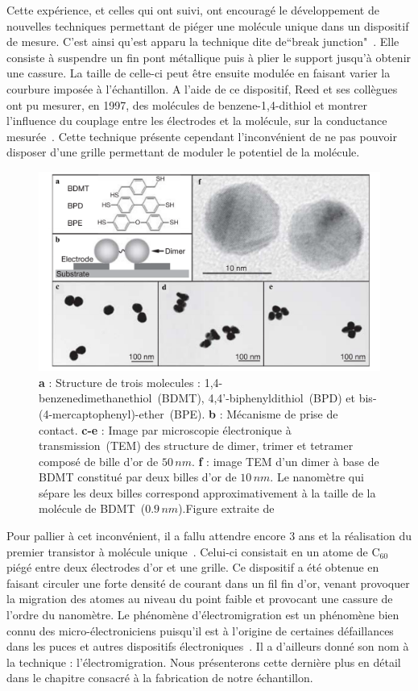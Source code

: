 Cette expérience, et celles qui ont suivi, ont encouragé le développement de nouvelles techniques permettant de piéger une molécule unique dans un dispositif de mesure. C'est ainsi qu'est apparu la technique dite de``break junction"~\cite{Zhou1995}. Elle consiste à suspendre un fin pont métallique puis à plier le support jusqu'à obtenir une cassure. La taille de celle-ci peut être ensuite modulée en faisant varier la courbure imposée à l'échantillon. A l'aide de ce dispositif, Reed et ses collègues ont pu mesurer, en 1997, des molécules de benzene-1,4-dithiol et montrer l'influence du couplage entre les électrodes et la molécule, sur la conductance mesurée~\cite{Reed1997}. Cette technique présente cependant l'inconvénient de ne pas pouvoir disposer d'une grille permettant de moduler le potentiel de la molécule.

\begin{figure}
\centering \includegraphics[scale=0.45]{Spintronique/MolSpintro2/MolSpintro2.pdf}
\caption{\textbf{a} : Structure de trois molecules : 1,4-benzenedimethanethiol~(BDMT), 4,4'-biphenyldithiol~(BPD) et bis-(4-mercaptophenyl)-ether~(BPE). \textbf{b} : Mécanisme de prise de contact. \textbf{c-e} : Image par microscopie électronique à transmission~(TEM) des structure de dimer, trimer et tetramer composé de bille d'or de $50\,nm$. \textbf{f} : image TEM d'un dimer à base de BDMT constitué par deux billes d'or de $10\,nm$. Le nanomètre qui sépare les deux billes correspond approximativement à la taille de la molécule de BDMT~($0.9\,nm$).Figure extraite de~\cite{Dadosh2005}}
\label{MolSpintro2}
\end{figure}


Pour pallier à cet inconvénient, il a fallu attendre encore 3 ans et la réalisation du premier transistor à molécule unique~\cite{Park2000}. Celui-ci consistait en un atome de C$_{60}$ piégé entre deux électrodes d'or et une grille. Ce dispositif a été obtenue en faisant circuler une forte densité de courant dans un fil fin d'or, venant provoquer la migration des atomes au niveau du point faible et provocant une cassure de l'ordre du nanomètre. Le phénomène d'électromigration est un phénomène bien connu des micro-électroniciens puisqu'il est à l'origine de certaines défaillances dans les puces et autres dispositifs électroniques~\cite{Ho1989,Tu1992}. Il a d'ailleurs donné son nom à la technique : l'électromigration. Nous présenterons cette dernière plus en détail dans le chapitre consacré à la fabrication de notre échantillon.


